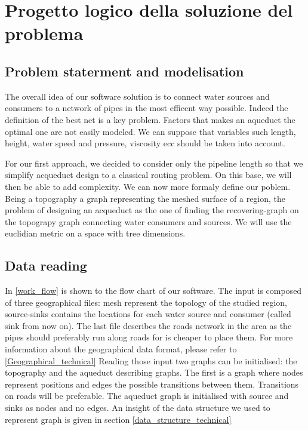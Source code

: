 \chapter{Progetto logico della soluzione del problema}
\label{capitolo4}
\thispagestyle{empty}


\section{Problem staterment and modelisation}
The overall idea of our software solution is to connect water sources and consumers to a network of 
pipes in the most efficent way possible. Indeed the definition of the best net is a key problem. 
Factors that makes an aqueduct the optimal one are not easily modeled. We can suppose that variables 
such length, height, water speed and pressure, viscosity ecc should be taken into account.

\bigbreak
For our first approach, we decided to consider only the pipeline length so that we simplify 
acqueduct design to a classical routing problem. On this base, we will then be able to add complexity.
We can now more formaly define our poblem. Being a topography a graph representing the meshed 
surface of a region, the problem of designing an acqueduct as the one of finding the recovering-graph 
on the topograpy graph connecting water consumers and sources. We will use the euclidian metric on a 
space with tree dimensions.



\section{Data reading}
In \ref{work_flow} is shown to the flow chart of our software. 
The input is composed of three geographical files: mesh represent the topology of the studied region, source-sinks contains the locations for each water source and consumer (called sink from now on). The last file describes the roads network in the area as the pipes should preferably run along roads for is cheaper to place them. For more information about the geographical data format, please refer to \ref{Geographical_technical}
Reading those input two graphs can be initialised: the topography and the aqueduct describing graphs. The first is a graph where nodes represent positions and edges the possible transitions between them. Transitions on roads will be preferable. The aqueduct graph is initialised with source and sinks as nodes and no edges. An insight of the data structure we used to represent graph is given in section \ref {data_structure_technical}







